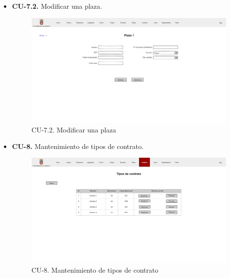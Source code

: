 \begin{itemize}
	\item \textbf{CU-7.2.} Modificar una plaza.
	\begin{figure}[!h]
		\centering
		\includegraphics[width=\textwidth]{../img/Anexos/Vistas/mod_plaza.png}
		\caption{CU-7.2. Modificar una plaza}\label{fig:../img/Anexos/Vistas/mod_plaza.png}
	\end{figure}
	
	\item \textbf{CU-8.} Mantenimiento de tipos de contrato.
	\begin{figure}[!h]
		\centering
		\includegraphics[width=\textwidth]{../img/Anexos/Vistas/contratos.png}
		\caption{CU-8. Mantenimiento de tipos de contrato}\label{fig:../img/Anexos/Vistas/contratos.png}
	\end{figure}
	

\end{itemize}
